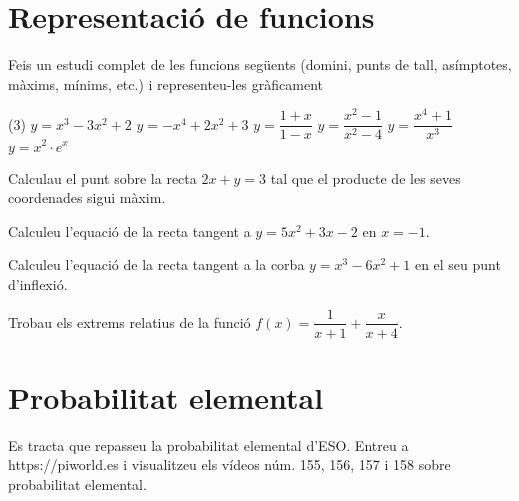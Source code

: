 \documentclass[11pt, a4paper, pdf]{article}
\let\frac\dfrac
\begin{document}
\section{Representació de funcions}

\begin{mylist}
	
	\item Feis un estudi complet de les funcions següents (domini, punts de tall, asímptotes, màxims, mínims, etc.)
 i representeu-les gràficament
 \begin{tasks}(3)
 	\task $y=x^3-3x^2+2$
 	\task $y=-x^4+2x^2+3$
 	\task $y=\frac{1+x}{1-x}$
 	\task $y=\frac{x^2-1}{x^2-4}$
 	\task $y=\frac{x^4+1}{x^3}$
 	\task $y=x^2 \cdot e^x $
 \end{tasks}
 
 
 	\item Calculau el punt sobre la recta $2x+y=3$ tal que el producte de les seves coordenades sigui màxim.
 	
 	\item Calculeu l'equació de la recta tangent a $y=5x^2+3x-2$ en $x=-1$.
 	
 	\item Calculeu l'equació de la recta tangent a la corba $y=x^3-6x^2+1$ en el seu punt d'inflexió.
 	
 	\item Trobau els extrems relatius de la funció $f(x)=\frac{1}{x+1} +\frac{x}{x+4}$.
 		
\end{mylist}

\section{Probabilitat elemental}

\begin{theorybox}
	Es tracta que repasseu la probabilitat elemental d'ESO. Entreu a https://piworld.es i visualitzeu els vídeos núm. 155, 156, 157 i 158 sobre probabilitat elemental.	
\end{theorybox}
\end{document}

